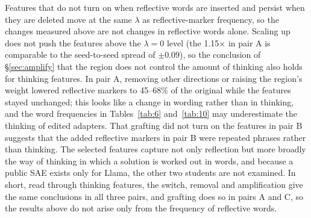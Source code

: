 Features that do not turn on when reflective words are inserted and persist when they are deleted move at the same $\lambda$ as reflective-marker frequency, so the changes measured above are not changes in reflective words alone. Scaling up does not push the features above the $\lambda=0$ level (the 1.15$\times$ in pair A is comparable to the seed-to-seed spread of $\pm 0.09$), so the conclusion of \S\ref{sec:amplify} that the region does not control the amount of thinking also holds for thinking features. In pair A, removing other directions or raising the region's weight lowered reflective markers to 45--68\% of the original while the features stayed unchanged; this looks like a change in wording rather than in thinking, and the word frequencies in Tables~\ref{tab:6} and~\ref{tab:10} may underestimate the thinking of edited adapters. That grafting did not turn on the features in pair B suggests that the added reflective markers in pair B were repeated phrases rather than thinking. The selected features capture not only reflection but more broadly the way of thinking in which a solution is worked out in words, and because a public SAE exists only for Llama, the other two students are not examined. In short, read through thinking features, the switch, removal and amplification give the same conclusions in all three pairs, and grafting does so in pairs A and C, so the results above do not arise only from the frequency of reflective words.

\begin{table}[t]
\centering
\small

\caption{Mean activation of thinking features when the Llama-3.2-1B student reads its own answers, where 1 is the level on the $\lambda=0$ teacher's solutions. Edit conditions are as in Tables~\ref{tab:6} and~\ref{tab:8}--\ref{tab:10}, and the last column is the value after reflective words are deleted from the $\lambda=0$ answers. The features turn off when the shared region is removed and stay unchanged when other directions are removed or the shared region is scaled up. Values after $\pm$ are standard deviations across three seeds.}
\label{tab:11}
\end{table}
